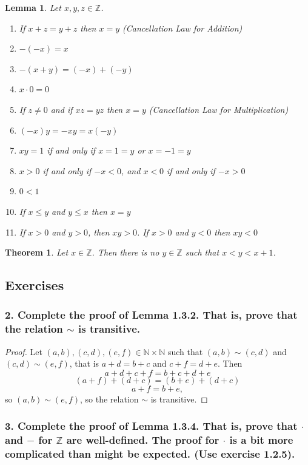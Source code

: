 \documentclass{article}
\newtheorem{theorem}{Theorem}
\newtheorem*{lemma}{Lemma}
\newcommand{\N}{\mathbb{N}}
\newcommand{\Z}{\mathbb{Z}}
\begin{document}
\begin{lemma}
	Let $x,y,z \in \Z$.
	\begin{enumerate}
		\item If $x + z = y + z$ then $x = y$ (Cancellation Law for Addition)
		\item $-(-x) = x$
		\item $-(x + y) = (-x) + (-y)$
		\item $x \cdot 0 = 0$
		\item If $z \ne 0$ and if $xz = yz$ then $x = y$ (Cancellation Law for Multiplication)
		\item $(-x)y = -xy = x(-y)$
		\item $xy = 1$ if and only if $x = 1 = y$ or $x = -1 = y$
		\item $x > 0$ if and only if $-x < 0$, and $x < 0$ if and only if $-x > 0$
		\item $0 < 1$
		\item If $x \le y$ and $y \le x$ then $x = y$
		\item If $x > 0$ and $y > 0$, then $xy > 0$. If $x > 0$ and $y < 0$ then $xy < 0$
	\end{enumerate}
\end{lemma}

\begin{theorem}
	Let $x \in \Z$. Then there is no $y \in \Z$ such that $x < y < x + 1$.
\end{theorem}

\subsection*{Exercises}

\subsubsection*{2. Complete the proof of Lemma 1.3.2. That is, prove that the relation $\sim$ is transitive.}

\begin{proof}
	Let $(a,b), (c,d), (e,f) \in \N \times \N$ such that $(a,b) \sim (c,d)$ and $(c,d) \sim (e,f)$, that is $a + d = b + c$ and $c + f = d + e$. Then
	\[ a + d + c + f = b + c + d + e \]
	\[ (a + f) + (d + c) = (b + e) + (d + c) \]
	\[ a + f = b + e, \] so $(a,b) \sim (e,f)$, so the relation $\sim$ is transitive.
\end{proof}

\subsubsection*{3. Complete the proof of Lemma 1.3.4. That is, prove that $\cdot$ and $-$ for $\Z$ are well-defined. The proof for $\cdot$ is a bit more complicated than might be expected. (Use exercise 1.2.5).}
\end{document}
